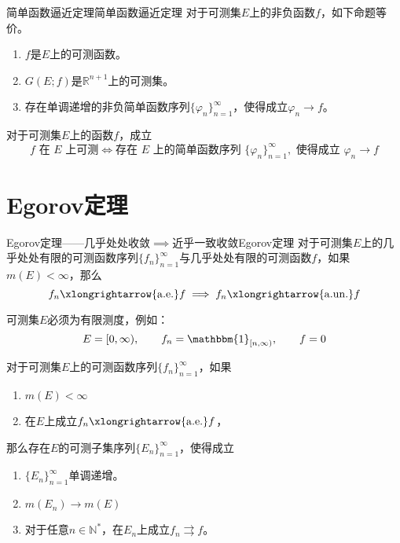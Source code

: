 \documentclass[lang = cn, scheme = chinese, thmcnt = section]{elegantbook}
\newcommand{\N}{\mathbb{N}}            %
\newcommand{\R}{\mathbb{R}}            %
\newcommand{\toae}{\xlongrightarrow{\mathrm{a.e.}}}
\newcommand{\toaun}{\xlongrightarrow{\mathrm{a.un.}}}
\begin{document}
\begin{theorem}{简单函数逼近定理}{简单函数逼近定理}
	对于可测集$E$上的非负函数$f$，如下命题等价。
	\begin{enumerate}
		\item $f$是$E$上的可测函数。
		\item $G(E;f)$是$\R^{n+1}$上的可测集。
		\item 存在单调递增的非负简单函数序列$\{ \varphi_n \}_{n=1}^{\infty}$，使得成立$\varphi_n\to f$。
	\end{enumerate}
\end{theorem}

\begin{corollary}
	对于可测集$E$上的函数$f$，成立%
	$$
	f\text{ 在 }E\text{ 上可测}
	\iff
	\text{存在 }E\text{ 上的简单函数序列 }\{\varphi_n\}_{n=1}^{\infty},\text{ 使得成立 }\varphi_n\to f
	$$
\end{corollary}

\section{Egorov定理}

\begin{theorem}{Egorov定理——几乎处处收敛$\implies$近乎一致收敛}{Egorov定理}
	对于可测集$E$上的几乎处处有限的可测函数序列$\{f_n\}_{n=1}^{\infty}$与几乎处处有限的可测函数$f$，如果$m(E)<\infty$，那么
	$$
	f_n\toae f\implies
	f_n\toaun f
	$$
\end{theorem}

\begin{remark}
	可测集$E$必须为有限测度，例如：
	$$
	E=[0,\infty),\qquad 
	f_n=\mathbbm{1}_{[n,\infty)},\qquad 
	f=0
	$$
\end{remark}

\begin{exercise}
	对于可测集$E$上的可测函数序列$\{f_n\}_{n=1}^{\infty}$，如果
	\begin{enumerate}
		\item $m(E)<\infty$
		\item 在$E$上成立$f_n\toae f$，
	\end{enumerate}
	那么存在$E$的可测子集序列$\{E_n\}_{n=1}^{\infty}$，使得成立
	\begin{enumerate}
		\item $\{E_n\}_{n=1}^{\infty}$单调递增。
		\item $m(E_n)\to m(E)$
		\item 对于任意$n\in\N^*$，在$E_n$上成立$f_n\rightrightarrows f$。
	\end{enumerate}
\end{exercise}
\end{document}
